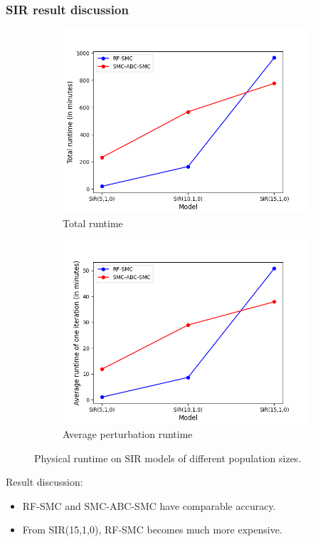 \documentclass{beamer}
\begin{document}
\begin{frame}
    \frametitle{SIR result discussion}
    \begin{figure}[H]
        \centering
        \begin{subfigure}{0.48\textwidth}
            \centering
            \includegraphics[width=\linewidth]{figures/sir_runtime_total.png}
            \caption{Total runtime}
        \end{subfigure}
        \hfill
        \begin{subfigure}{0.48\textwidth}
            \centering
            \includegraphics[width=\linewidth]{figures/sir_runtime_avg.png}
            \caption{Average perturbation runtime}
        \end{subfigure}
        \caption{Physical runtime on SIR models of different population sizes.}
    \end{figure}
    Result discussion:
    \begin{itemize}
        \item RF-SMC and SMC-ABC-SMC have comparable accuracy.
        \item From SIR(15,1,0), RF-SMC becomes much more expensive.
    \end{itemize}
\end{frame}
\end{document}
